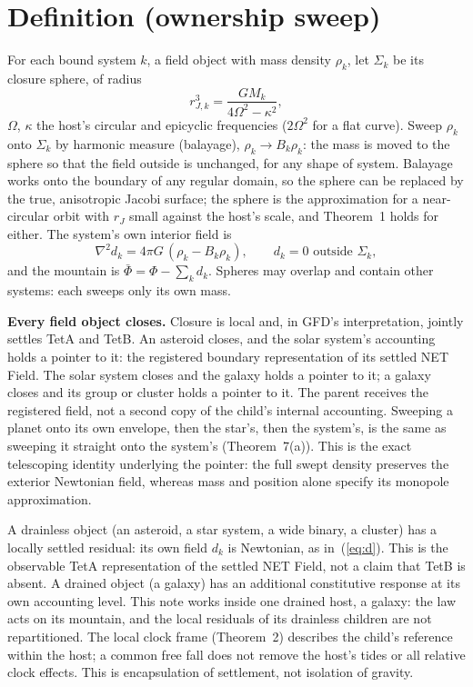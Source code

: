 \documentclass[twocolumn]{iopjournal}
\begin{document}

\section*{Definition (ownership sweep)}

For each bound system $k$, a field object with mass density $\rho_k$,
let $\Sigma_k$ be its closure sphere, of radius
\begin{equation}
r_{J,k}^3 = \frac{GM_k}{4\Omega^2 - \kappa^2},
\label{eq:rJ}
\end{equation}
$\Omega$, $\kappa$ the host's circular and epicyclic frequencies
($2\Omega^2$ for a flat curve). Sweep $\rho_k$ onto $\Sigma_k$ by
harmonic measure (balayage), $\rho_k \to B_k\rho_k$: the mass is moved
to the sphere so that the field outside is unchanged, for any shape of
system. Balayage works onto the boundary of any regular domain, so the
sphere can be replaced by the true, anisotropic Jacobi surface; the
sphere is the approximation for a near-circular orbit with $r_J$ small
against the host's scale, and Theorem~1 holds for either. The system's own interior field is
\begin{equation}
\nabla^2 d_k = 4\pi G\,(\rho_k - B_k\rho_k),\qquad d_k = 0 \text{ outside } \Sigma_k,
\label{eq:d}
\end{equation}
and the mountain is $\bar\Phi = \Phi - \sum_k d_k$. Spheres may overlap
and contain other systems: each sweeps only its own mass.

\textbf{Every field object closes.} Closure is local and, in GFD's
interpretation, jointly settles TetA and TetB. An asteroid closes,
and the solar system's accounting holds a pointer to it: the
registered boundary representation of its settled NET Field.
The solar system closes and the galaxy holds a pointer to it;
a galaxy closes and its group or cluster holds a pointer to it.
The parent receives the registered field, not a second copy of
the child's internal accounting. Sweeping a planet onto its own
envelope, then the star's, then the system's, is the same as sweeping
it straight onto the system's (Theorem~7(a)). This is the exact
telescoping identity underlying the pointer: the full swept density
preserves the exterior Newtonian field, whereas mass and position
alone specify its monopole approximation.

A drainless object (an asteroid, a star system, a wide binary, a
cluster) has a locally settled residual: its own field $d_k$ is
Newtonian, as in~(\ref{eq:d}). This is the observable TetA
representation of the settled NET Field, not a claim that TetB is
absent. A drained object (a galaxy) has an additional constitutive
response at its own accounting level. This note works inside one
drained host, a galaxy: the law acts on its mountain, and the local
residuals of its drainless children are not repartitioned.
The local clock frame (Theorem~2) describes the child's reference
within the host; a common free fall does not remove the host's tides
or all relative clock effects. This is encapsulation of settlement,
not isolation of gravity.
\end{document}
